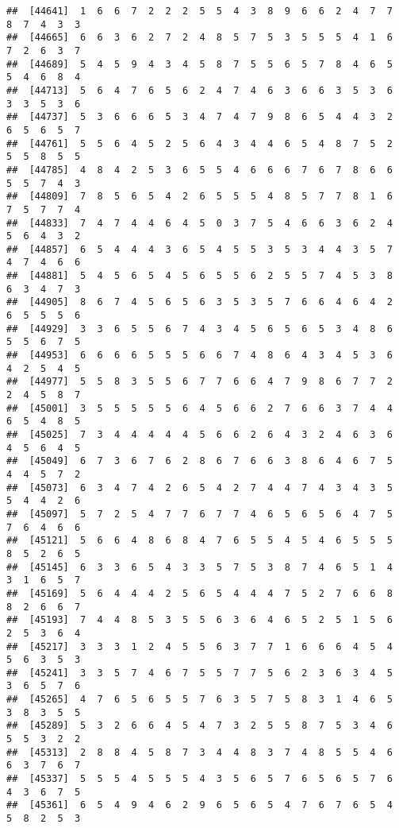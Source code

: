 \documentclass[
]{book}
\begin{document}
\begin{verbatim}
##  [44641]  1  6  6  7  2  2  2  5  5  4  3  8  9  6  6  2  4  7  7  8  7  4  3  3
##  [44665]  6  6  3  6  2  7  2  4  8  5  7  5  3  5  5  5  4  1  6  7  2  6  3  7
##  [44689]  5  4  5  9  4  3  4  5  8  7  5  5  6  5  7  8  4  6  5  5  4  6  8  4
##  [44713]  5  6  4  7  6  5  6  2  4  7  4  6  3  6  6  3  5  3  6  3  3  5  3  6
##  [44737]  5  3  6  6  6  5  3  4  7  4  7  9  8  6  5  4  4  3  2  6  5  6  5  7
##  [44761]  5  5  6  4  5  2  5  6  4  3  4  4  6  5  4  8  7  5  2  5  5  8  5  5
##  [44785]  4  8  4  2  5  3  6  5  5  4  6  6  6  7  6  7  8  6  6  5  5  7  4  3
##  [44809]  7  8  5  6  5  4  2  6  5  5  5  4  8  5  7  7  8  1  6  7  5  7  7  4
##  [44833]  7  4  7  4  4  6  4  5  0  3  7  5  4  6  6  3  6  2  4  5  6  4  3  2
##  [44857]  6  5  4  4  4  3  6  5  4  5  5  3  5  3  4  4  3  5  7  4  7  4  6  6
##  [44881]  5  4  5  6  5  4  5  6  5  5  6  2  5  5  7  4  5  3  8  6  3  4  7  3
##  [44905]  8  6  7  4  5  6  5  6  3  5  3  5  7  6  6  4  6  4  2  6  5  5  5  6
##  [44929]  3  3  6  5  5  6  7  4  3  4  5  6  5  6  5  3  4  8  6  5  5  6  7  5
##  [44953]  6  6  6  6  5  5  5  6  6  7  4  8  6  4  3  4  5  3  6  4  2  5  4  5
##  [44977]  5  5  8  3  5  5  6  7  7  6  6  4  7  9  8  6  7  7  2  2  4  5  8  7
##  [45001]  3  5  5  5  5  5  6  4  5  6  6  2  7  6  6  3  7  4  4  6  5  4  8  5
##  [45025]  7  3  4  4  4  4  4  5  6  6  2  6  4  3  2  4  6  3  6  4  5  6  4  5
##  [45049]  6  7  3  6  7  6  2  8  6  7  6  6  3  8  6  4  6  7  5  4  4  5  7  2
##  [45073]  6  3  4  7  4  2  6  5  4  2  7  4  4  7  4  3  4  3  5  5  4  4  2  6
##  [45097]  5  7  2  5  4  7  7  6  7  7  4  6  5  6  5  6  4  7  5  7  6  4  6  6
##  [45121]  5  6  6  4  8  6  8  4  7  6  5  5  4  5  4  6  5  5  5  8  5  2  6  5
##  [45145]  6  3  3  6  5  4  3  3  5  7  5  3  8  7  4  6  5  1  4  3  1  6  5  7
##  [45169]  5  6  4  4  4  2  5  6  5  4  4  4  7  5  2  7  6  6  8  8  2  6  6  7
##  [45193]  7  4  4  8  5  3  5  5  6  3  6  4  6  5  2  5  1  5  6  2  5  3  6  4
##  [45217]  3  3  3  1  2  4  5  5  6  3  7  7  1  6  6  6  4  5  4  5  6  3  5  3
##  [45241]  3  3  5  7  4  6  7  5  5  7  7  5  6  2  3  6  3  4  5  3  6  5  7  6
##  [45265]  4  7  6  5  6  5  5  7  6  3  5  7  5  8  3  1  4  6  5  3  8  3  5  5
##  [45289]  5  3  2  6  6  4  5  4  7  3  2  5  5  8  7  5  3  4  6  5  5  3  2  2
##  [45313]  2  8  8  4  5  8  7  3  4  4  8  3  7  4  8  5  5  4  6  6  3  7  6  7
##  [45337]  5  5  5  4  5  5  5  4  3  5  6  5  7  6  5  6  5  7  6  4  3  6  7  5
##  [45361]  6  5  4  9  4  6  2  9  6  5  6  5  4  7  6  7  6  5  4  5  8  2  5  3

\end{verbatim}
\end{document}
